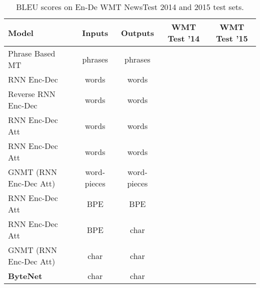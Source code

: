 \documentclass{article}
\begin{document}
\begin{table*}[t]
\small
  \begin{center}
  \begin{tabular}{lcccc}
    \toprule
    \textbf{Model}  & \textbf{Inputs} & \textbf{Outputs} & \textbf{WMT Test '14} & \textbf{WMT Test '15} \\ \midrule
      Phrase Based MT \citep{freitag14:wmtEuBridge, DBLP:conf/wmt/WilliamsSNHK15} & phrases & phrases &  &  \\ \midrule
      RNN Enc-Dec \citep{luong-pham-manning:2015:EMNLP} & words & words &    \\
      Reverse RNN Enc-Dec \citep{luong-pham-manning:2015:EMNLP} & words & words &    \\
      RNN Enc-Dec Att \cite{zhou2016deep} & words & words &  \\
      RNN Enc-Dec Att \citep{luong-pham-manning:2015:EMNLP} & words & words &  \\
        GNMT   (RNN Enc-Dec Att) \citep{wu2016} & word-pieces & word-pieces &   &  \\ \midrule
      RNN Enc-Dec Att \citep{DBLP:conf/acl/ChungCB16} & BPE & BPE &  &  \\

      RNN Enc-Dec Att \citep{DBLP:conf/acl/ChungCB16}  & BPE & char &  &  \\
      GNMT (RNN Enc-Dec Att) \citep{wu2016} & char & char &  \\

      \textbf{ByteNet} & char & char &   &  \\ 

      \bottomrule
  \end{tabular}
  \end{center}
\caption{BLEU scores on En-De WMT NewsTest 2014 and 2015 test sets.}
\label{mt}
\end{table*}
\end{document}
